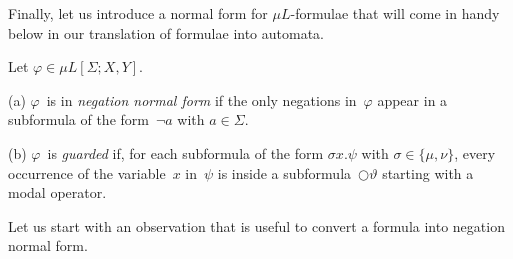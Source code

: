 \documentclass[10pt, fleqn]{scrartcl}
\newcommand*{\suc}{\mathrm{suc}}
\newcommand*{\op}{\mathrm{op}}
\newcommand*{\?}{\kern .08em}
\newcommand\nmodels{\not\models}
\newcommand\medcircle{\bigcirc}
\newcommand\lsem{[\![}
\newcommand\rsem{]\!]}
\newcommand\upqed{\vskip-\baselineskip\vskip-\belowdisplayskip}
\begin{document}
Finally, let us introduce a normal form for $\mu L$-formulae that will come in handy below
in our translation of formulae into automata.
\begin{Def}
Let $\varphi \in \mu L[\Sigma;X,Y]$.

(a) $\varphi$~is in \emph{negation normal form} if the only negations in~$\varphi$
appear in a subformula of the form~$\neg a$ with $a \in \Sigma$.

(b) $\varphi$~is \emph{guarded} if, for each subformula of the form $\sigma x.\psi$ with
$\sigma \in \{\mu,\nu\}$, every occurrence of the variable~$x$ in~$\psi$ is inside
a subformula~${\medcircle}\vartheta$ starting with a modal operator.
\end{Def}

Let us start with an observation that is useful to convert a formula into negation normal form.
\end{document}
